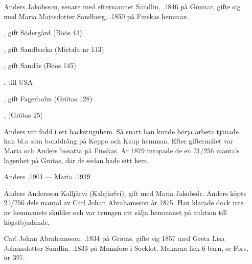 %
Anders Jakobsson, senare med efternamnet Sandlin, .1846 på Gunnar, gifte sig med Maria Mattsdotter Sandberg, .1850 på Finskas hemman.
\begin{jhchildren}
  \item {}
  \item {}, gift Södergård (Böös 44)
  \item {}, gift Sandbacka (Mietala nr 113)
  \item {}, gift Sandås (Böös 145)
  \item {}, till USA
  \item {}
  \item {}
  \item {}, gift Fagerholm (Grötas 128)
  \item {}, (Grötas 25)
\end{jhchildren}

Anders var född i ett backstuguhem. Så snart han kunde börja arbeta tjänade han bl.a som bonddräng på Keppo och Kaup hemman. Efter giftermålet var Maria och Anders bosatta på Finskas. År 1879 inropade de en 21/256 mantals lägenhet på Grötas, där de sedan hade sitt hem.

Anders .1901  ---  Maria .1939


%
Anders Andersson Kalljärvi (Kalejärfvi), gift med Maria Jakobsdr. Anders köpte 21/256 dels mantal av Carl Johan Abrahamsson år 1875. Han klarade dock inte av hemmanets skulder och var tvungen att sälja hemmanet på auktion till högstbjudande.\jhvspace{}


%
Carl Johan Abrahamsson, .1834 på Grötas, gifte sig 1857 med Greta Lisa Johansdotter Sundlin, .1833 på Mannfors i Socklot. Makarna fick 6 barn, se Fors, nr 397.


